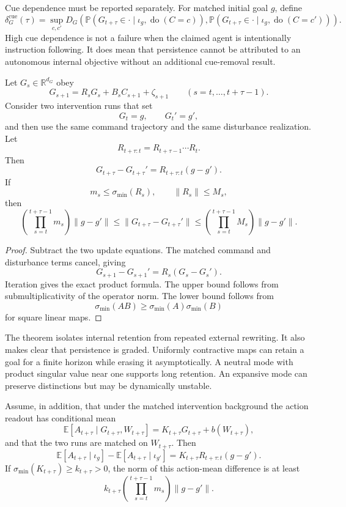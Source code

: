 Cue dependence must be reported separately. For matched initial goal \(g\),
define
\[
\delta_G^{\mathrm{cue}}(\tau)
=
\sup_{c,c'}
D_G
\left(
\mathbb P(G_{t+\tau}\in\cdot\mid\iota_g,\operatorname{do}(C=c)),
\mathbb P(G_{t+\tau}\in\cdot\mid\iota_g,\operatorname{do}(C=c'))
\right).
\]
High cue dependence is not a failure when the claimed agent is intentionally
instruction following. It does mean that persistence cannot be attributed to
an autonomous internal objective without an additional cue-removal result.


\begin{SRWTtheorem}
\label{SRWT:thm:goal-retention}
Let \(G_s\in\mathbb R^{d_G}\) obey
\[
G_{s+1}
=
R_sG_s+B_sC_{s+1}+\zeta_{s+1}
\qquad
(s=t,\ldots,t+\tau-1).
\]
Consider two intervention runs that set
\[
G_t=g,
\qquad
G_t'=g',
\]
and then use the same command trajectory and the same disturbance realization.
Let
\[
R_{t+\tau:t}
=
R_{t+\tau-1}\cdots R_t.
\]
Then
\[
\boxed{
G_{t+\tau}-G_{t+\tau}'
=
R_{t+\tau:t}(g-g').
}
\]
If
\[
m_s
\leq
\sigma_{\min}(R_s),
\qquad
\|R_s\|\leq M_s,
\]
then
\[
\boxed{
\left(
\prod_{s=t}^{t+\tau-1}m_s
\right)
\|g-g'\|
\leq
\|G_{t+\tau}-G_{t+\tau}'\|
\leq
\left(
\prod_{s=t}^{t+\tau-1}M_s
\right)
\|g-g'\|.
}
\]
\end{SRWTtheorem}

\begin{proof}
Subtract the two update equations. The matched command and disturbance terms
cancel, giving
\[
G_{s+1}-G_{s+1}'
=
R_s(G_s-G_s').
\]
Iteration gives the exact product formula. The upper bound follows from
submultiplicativity of the operator norm. The lower bound follows from
\[
\sigma_{\min}(AB)
\geq
\sigma_{\min}(A)\sigma_{\min}(B)
\]
for square linear maps.
\end{proof}

The theorem isolates internal retention from repeated external rewriting. It
also makes clear that persistence is graded. Uniformly contractive maps can
retain a goal for a finite horizon while erasing it asymptotically. A neutral
mode with product singular value near one supports long retention. An
expansive mode can preserve distinctions but may be dynamically unstable.

\begin{SRWTcorollary}
\label{SRWT:cor:goal-action-readout}
Assume, in addition, that under the matched intervention background the action
readout has conditional mean
\[
\mathbb E[A_{t+\tau}\mid G_{t+\tau},W_{t+\tau}]
=
K_{t+\tau}G_{t+\tau}+b(W_{t+\tau}),
\]
and that the two runs are matched on \(W_{t+\tau}\). Then
\[
\mathbb E[A_{t+\tau}\mid\iota_g]
-
\mathbb E[A_{t+\tau}\mid\iota_{g'}]
=
K_{t+\tau}R_{t+\tau:t}(g-g').
\]
If \(\sigma_{\min}(K_{t+\tau})\geq k_{t+\tau}>0\), the norm of this action-mean
difference is at least
\[
k_{t+\tau}
\left(
\prod_{s=t}^{t+\tau-1}m_s
\right)
\|g-g'\|.
\]
\end{SRWTcorollary}

